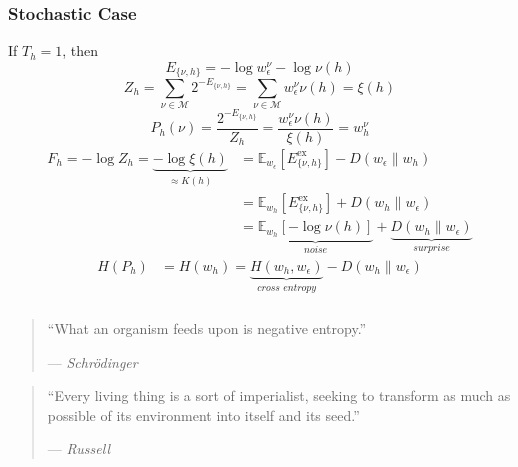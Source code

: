 \documentclass[UTF8,11pt,colorlinks,compress,openany]{beamer}%
\begin{document}
\begin{frame}\frametitle{Stochastic Case}
If $T_h=1$, then
\[E_{\{\nu,h\}}=-\log w_\epsilon^\nu-\log\nu(h)\]
\[Z_h=\sum\limits_{\nu\in\mathcal{M}}2^{-E_{\{\nu,h\}}}=\sum\limits_{\nu\in\mathcal{M}}w_\epsilon^\nu\nu(h)=\xi(h)\]
\[P_h(\nu)=\frac{2^{-E_{\{\nu,h\}}}}{Z_h}=\frac{w_\epsilon^\nu\nu(h)}{\xi(h)}=w_h^\nu\]
\begin{align*}
F_h=-\log Z_h=\underbrace{-\log\xi(h)}_{\approx K(h)}&=\mathbb{E}_{w_\epsilon}\left[E_{\{\nu,h\}}^{\mathrm{ex}}\right]-D(w_\epsilon\|w_h)\\
&=\mathbb{E}_{w_h}\left[E_{\{\nu,h\}}^{\mathrm{ex}}\right]+D(w_h\|w_\epsilon)\\
&=\underbrace{\mathbb{E}_{w_h}[-\log\nu(h)]}_{\textit{noise}}+\underbrace{D(w_h\|w_\epsilon)}_{\textit{surprise}}
\end{align*}
\begin{align*}
	H(P_h)&=H(w_h)=\underbrace{H(w_h,w_\epsilon)}_{\textit{cross entropy}}-D(w_h\|w_\epsilon)
\end{align*}
\end{frame}

\begin{frame}\frametitle{}
\begin{quote}
``What an organism feeds upon is negative entropy.''\par
\hfill --- \textsl{Schr\"odinger}
\end{quote}
\begin{quote}
``Every living thing is a sort of imperialist, seeking to transform as much as possible of its environment into itself and its seed.''\par
\hfill --- \textsl{Russell}
\end{quote}
\end{frame}
\end{document}
